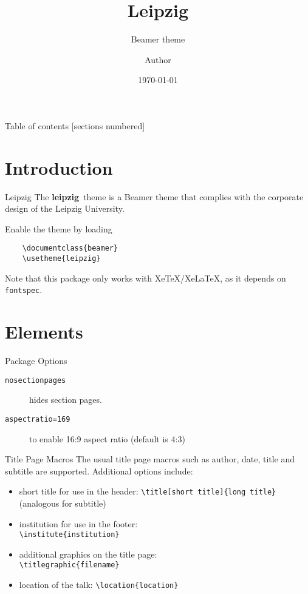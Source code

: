 \documentclass[noserifmath,aspectratio=169]{beamer}
\title[Leipzig]{Leipzig}
\subtitle[Beamer Theme]{Beamer theme}
\author{Author}
\institute{Institute}
\date{\today}
\newcommand{\themename}{\textbf{leipzig}~}
\begin{document}
\maketitle

\begin{frame}{Table of contents}
  [sections numbered]
  \tableofcontents[hideallsubsections]
\end{frame}

\section{Introduction}

\begin{frame}[fragile]{Leipzig}
The \themename theme is a Beamer theme that complies with the corporate design of the Leipzig University.

Enable the theme by loading
\begin{verbatim}
    \documentclass{beamer}
    \usetheme{leipzig}
\end{verbatim}

Note that this package only works with XeTeX/XeLaTeX, as it depends on \texttt{fontspec}.
\end{frame}

\section{Elements}
\begin{frame}[fragile]{Package Options}
\begin{description}
\item[\texttt{nosectionpages}] hides section pages.
\item[\texttt{aspectratio=169}] to enable 16:9 aspect ratio (default is 4:3)
\end{description}
\end{frame}

\begin{frame}[fragile]{Title Page Macros}
The usual title page macros such as author, date, title and subtitle are supported.
Additional options include:
\begin{itemize}
\item short title for use in the header: \verb+\title[short title]{long title}+ (analogous for subtitle)
\item institution for use in the footer: \\ \verb+\institute{institution}+
\item additional graphics on the title page: \\ \verb+\titlegraphic{filename}+
\item location of the talk: \verb+\location{location}+
\end{itemize}
\end{frame}
\end{document}
